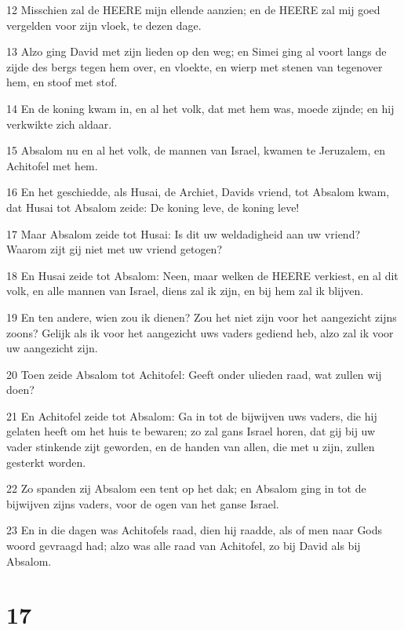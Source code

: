 \par 12 Misschien zal de HEERE mijn ellende aanzien; en de HEERE zal mij goed vergelden voor zijn vloek, te dezen dage.
\par 13 Alzo ging David met zijn lieden op den weg; en Simei ging al voort langs de zijde des bergs tegen hem over, en vloekte, en wierp met stenen van tegenover hem, en stoof met stof.
\par 14 En de koning kwam in, en al het volk, dat met hem was, moede zijnde; en hij verkwikte zich aldaar.
\par 15 Absalom nu en al het volk, de mannen van Israel, kwamen te Jeruzalem, en Achitofel met hem.
\par 16 En het geschiedde, als Husai, de Archiet, Davids vriend, tot Absalom kwam, dat Husai tot Absalom zeide: De koning leve, de koning leve!
\par 17 Maar Absalom zeide tot Husai: Is dit uw weldadigheid aan uw vriend? Waarom zijt gij niet met uw vriend getogen?
\par 18 En Husai zeide tot Absalom: Neen, maar welken de HEERE verkiest, en al dit volk, en alle mannen van Israel, diens zal ik zijn, en bij hem zal ik blijven.
\par 19 En ten andere, wien zou ik dienen? Zou het niet zijn voor het aangezicht zijns zoons? Gelijk als ik voor het aangezicht uws vaders gediend heb, alzo zal ik voor uw aangezicht zijn.
\par 20 Toen zeide Absalom tot Achitofel: Geeft onder ulieden raad, wat zullen wij doen?
\par 21 En Achitofel zeide tot Absalom: Ga in tot de bijwijven uws vaders, die hij gelaten heeft om het huis te bewaren; zo zal gans Israel horen, dat gij bij uw vader stinkende zijt geworden, en de handen van allen, die met u zijn, zullen gesterkt worden.
\par 22 Zo spanden zij Absalom een tent op het dak; en Absalom ging in tot de bijwijven zijns vaders, voor de ogen van het ganse Israel.
\par 23 En in die dagen was Achitofels raad, dien hij raadde, als of men naar Gods woord gevraagd had; alzo was alle raad van Achitofel, zo bij David als bij Absalom.

\chapter{17}

